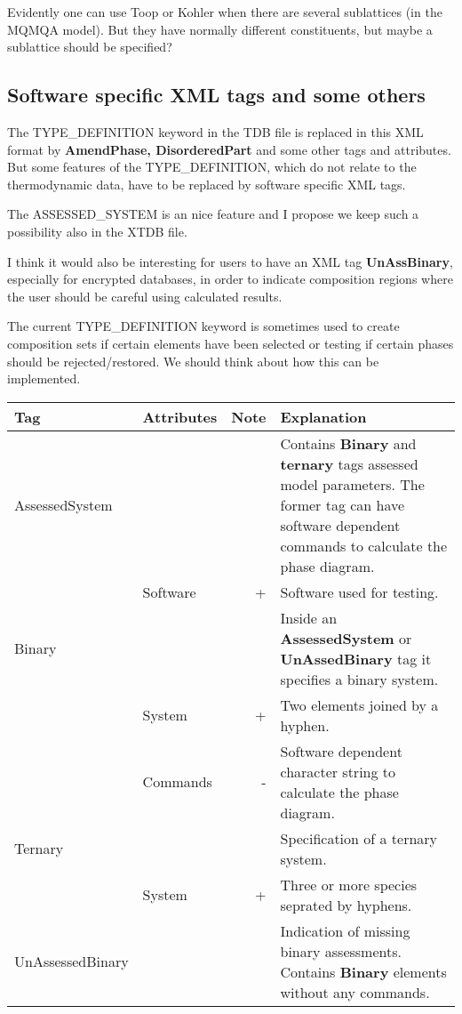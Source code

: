 \documentclass{article}
\begin{document}
\bigskip
Evidently one can use Toop or Kohler when there are several
sublattices (in the MQMQA model).  But they have normally different
constituents, but maybe a sublattice should be specified?

\newpage 

\subsection{Software specific XML tags and some others}\label{sec:soft}

The TYPE\_DEFINITION keyword in the TDB file is replaced in this XML
format by {\bf AmendPhase, DisorderedPart} and some other tags and
attributes.  But some features of the TYPE\_DEFINITION, which do not
relate to the thermodynamic data, have to be replaced by software
specific XML tags.

The ASSESSED\_SYSTEM is an nice feature and I propose we keep such a
possibility also in the XTDB file.

I think it would also be interesting for users to have an XML tag {\bf
  UnAssBinary}, especially for encrypted databases, in order to
indicate composition regions where the user should be careful using
calculated results.

The current TYPE\_DEFINITION keyword is sometimes used to create
composition sets if certain elements have been selected or testing if
certain phases should be rejected/restored.  We should think about how
this can be implemented.

\bigskip
\begin{tabular}{|p{} p{} r p{}|}\hline
  Tag & Attributes & Note & Explanation\\\hline

  AssessedSystem & & & Contains {\bf Binary} and {\bf ternary} tags
                       assessed model parameters. The former tag
                       can have software dependent commands to
                       calculate the phase diagram.\\
           & Software & + & Software used for testing.\\\hline

  Binary & & & Inside an {\bf AssessedSystem} or {\bf UnAssedBinary} tag it
               specifies a binary system.\\
      & System & + & Two elements joined by a hyphen.\\
      & Commands & - & Software dependent character string to
                       calculate the phase diagram.\\\hline

  Ternary & & & Specification of a ternary system.\\
      & System & + & Three or more species seprated by hyphens.\\\hline

  UnAssessedBinary & & & Indication of missing binary assessments.
                    Contains {\bf Binary} elements without any commands.\\\hline

\end{tabular}
\end{document}
